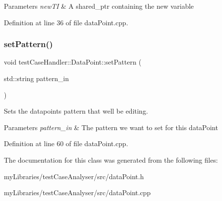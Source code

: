 \begin{DoxyParams}{Parameters}
{\em new\+TI} & A shared\+\_\+ptr containing the new variable \\
\hline
\end{DoxyParams}


Definition at line 36 of file data\+Point.\+cpp.

\mbox{\label{classtestCaseHandler_1_1DataPoint_a879b81d28cb15fd6e92179e183e0d678}} 
\subsubsection{\texorpdfstring{setPattern()}{setPattern()}}
{\footnotesize\ttfamily void test\+Case\+Handler\+::\+Data\+Point\+::set\+Pattern (\begin{DoxyParamCaption}\item[{std\+::string}]{pattern\+\_\+in }\end{DoxyParamCaption})}



Sets the datapoints pattern that we\textquotesingle{}ll be editing. 


\begin{DoxyParams}{Parameters}
{\em pattern\+\_\+in} & The pattern we want to set for this data\+Point \\
\hline
\end{DoxyParams}


Definition at line 60 of file data\+Point.\+cpp.



The documentation for this class was generated from the following files\+:\begin{DoxyCompactItemize}
\item 
my\+Libraries/test\+Case\+Analyser/src/data\+Point.\+h\item 
my\+Libraries/test\+Case\+Analyser/src/data\+Point.\+cpp\end{DoxyCompactItemize}
